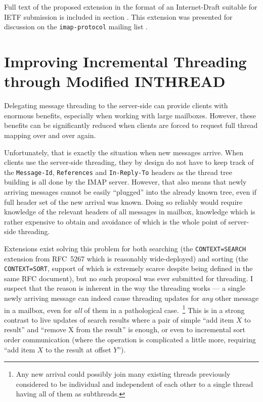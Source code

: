 \documentclass[trojita]{subfiles}
\begin{document}
Full text of the proposed extension in the format of an Internet-Draft suitable for IETF submission is included in
section .  This extension was presented for discussion on the {\tt imap-protocol}
mailing list \cite{jkt-i-p-draft-qresync-arrived-01}.

\section{Improving Incremental Threading through Modified INTHREAD}
\label{sec:draft-incthread}

Delegating message threading to the server-side can provide clients with enormous benefits, especially when working with
large mailboxes.  However, these benefits can be significantly reduced when clients are forced to request full thread
mapping over and over again.

Unfortunately, that is exactly the situation when new messages arrive.  When clients use the server-side threading, they
by design do not have to keep track of the {\tt Message-Id}, {\tt References} and {\tt In-Reply-To} headers as the
thread tree building is all done by the IMAP server.  However, that also means that newly arriving messages cannot be
easily ``plugged'' into the already known tree, even if full header set of the new arrival was known.  Doing so reliably
would require knowledge of the relevant headers of all messages in mailbox, knowledge which is rather expensive to
obtain and avoidance of which is the whole point of server-side threading.

Extensions exist solving this problem for both searching (the {\tt CONTEXT=SEARCH} extension from RFC~5267
\cite{rfc5267} which is reasonably wide-deployed) and sorting (the {\tt CONTEXT=SORT}, support of which is extremely
scarce despite being defined in the same RFC document), but no such proposal was ever submitted for threading.  I
suspect that the reason is inherent in the way the threading works --- a single newly arriving message can indeed cause
threading updates for {\em any} other message in a mailbox, even for {\em all} of them in a pathological
case.~\footnote{Any new arrival could possibly join many existing threads previously considered to be individual and
independent of each other to a single thread having all of them as subthreads.}  This is in a strong contrast to live
updates of search results where a pair of simple ``add item $X$ to result'' and ``remove X from the result'' is enough,
or even to incremental sort order communication (where the operation is complicated a little more, requiring ``add item
$X$ to the result at offset
$Y$'').
\end{document}
